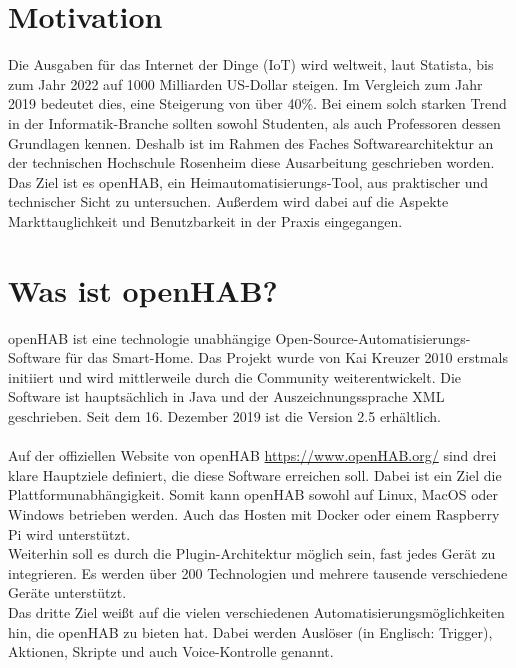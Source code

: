 \section{Motivation}
{Die Ausgaben für das Internet der Dinge (IoT) wird weltweit, laut Statista, bis zum Jahr 2022 auf 1000 Milliarden US-Dollar steigen. Im Vergleich zum Jahr 2019 bedeutet dies, eine Steigerung von über 40\%.}\cite{STATISTA01:IOT} Bei einem solch starken Trend in der Informatik-Branche sollten sowohl Studenten, als auch Professoren dessen Grundlagen kennen.
Deshalb ist im Rahmen des Faches Softwarearchitektur an der technischen Hochschule Rosenheim diese Ausarbeitung geschrieben worden. Das Ziel ist es openHAB, ein Heimautomatisierungs-Tool, aus praktischer und technischer Sicht zu untersuchen. Außerdem wird dabei auf die Aspekte Markttauglichkeit und Benutzbarkeit in der Praxis eingegangen.

\section{Was ist openHAB?}
\label{s:what-is-openHAB}
openHAB ist eine technologie unabhängige Open-Source-Automatisierungs-Software für das Smart-Home.
Das Projekt wurde von Kai Kreuzer 2010 erstmals initiiert und wird mittlerweile durch die Community weiterentwickelt. Die Software ist hauptsächlich in Java und der Auszeichnungssprache XML geschrieben. Seit dem 16. Dezember 2019 ist die Version 2.5 erhältlich.\\
\\
Auf der offiziellen Website von openHAB \url{https://www.openHAB.org/} sind drei klare Hauptziele definiert, die diese Software erreichen soll. Dabei ist ein Ziel die Plattformunabhängigkeit. Somit kann openHAB sowohl auf Linux, MacOS oder Windows betrieben werden. Auch das Hosten mit Docker oder einem Raspberry Pi wird unterstützt.\\
Weiterhin soll es durch die Plugin-Architektur möglich sein, fast jedes Gerät zu integrieren.
Es werden über 200 Technologien und mehrere tausende verschiedene Geräte unterstützt.\\
Das dritte Ziel weißt auf die vielen verschiedenen Automatisierungsmöglichkeiten hin, die openHAB zu bieten hat. Dabei werden Auslöser (in Englisch: Trigger), Aktionen, Skripte und auch Voice-Kontrolle genannt.

